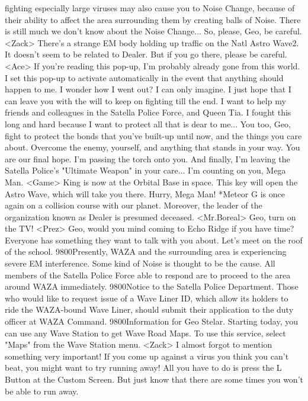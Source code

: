 fighting especially large viruses may also cause you to Noise Change, 
because of their ability to affect the area 
surrounding them by creating balls of Noise. 
There is still much we don't know about the Noise Change... 
So, please, Geo, be careful. 
<Zack> There's a strange EM body holding up traffic on the Natl Astro Wave2. 
It doesn't seem to be related to Dealer. 
But if you go there, please be careful. 
<Ace> If you're reading this pop-up, I'm probably 
already gone from this world. 
I set this pop-up to activate automatically in 
the event that anything should happen to me. 
I wonder how I went out? I can only imagine. 
I just hope that I can leave you with the will to 
keep on fighting till the end. 
I want to help my friends and colleagues in the 
Satella Police Force, and Queen Tia. 
I fought this long and hard because I want to protect all that is dear to me... 
You too, Geo, fight to protect the bonds that you've built-up until now, 
and the things you care about. 
Overcome the enemy, yourself, and anything that stands in your way. 
You are our final hope. I'm passing the torch onto you. 
And finally, I'm leaving the Satella Police's 
"Ultimate Weapon" in your care... 
I'm counting on you, Mega Man. 
<Game> King is now at the Orbital Base in space. This key will open the 
Astro Wave, which will take you there. Hurry, Mega Man! 
*Meteor G is once again on a collision course with our planet. 
Moreover, the leader of the organization known as 
Dealer is presumed deceased. 
<Mr.Boreal> Geo, turn on the TV! 
<Prez> Geo, would you mind coming to Echo Ridge if you have time? 
Everyone has something they want to talk with you about. 
Let's meet on the roof of the school. 
{98}{00}Presently, WAZA and the surrounding area is experiencing severe 
EM interference. Some kind of Noise is thought to be the cause. 
All members of the Satella Police Force able to respond are to 
proceed to the area around WAZA immediately. 
{98}{00}Notice to the Satella Police Department. 
Those who would like to request issue of a Wave Liner ID, which 
allow its holders to ride the WAZA-bound Wave Liner, should submit their 
application to the duty officer at WAZA Command. 
{98}{00}Information for Geo Stelar. 
Starting today, you can use any Wave Station to get Wave Road Maps. 
To use this service, select "Maps" from the Wave Station menu. 
<Zack> I almost forgot to mention something very important! 
If you come up against a virus you think you 
can't beat, you might want to try running away! 
All you have to do is press the L Button at the Custom Screen. 
But just know that there are some times you won't be able to run away. 
